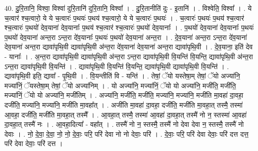 \documentclass[17pt]{extarticle}
\begin{document}
40. दु॒रि॒तानि॒ विश्वा॒ विश्वा॑ दुरि॒तानि॑ दुरि॒तानि॒ विश्वा᳚ । . दु॒रि॒तानीति॑ दुः - इ॒तानि॑ । . विश्वेति॒ विश्वा᳚ । . ये च॒त्वार॑ श्च॒त्वारो॒ ये ये च॒त्वारः॑ प॒थयः॑ प॒थय॑ श्च॒त्वारो॒ ये ये च॒त्वारः॑ प॒थयः॑ । . च॒त्वारः॑ प॒थयः॑ प॒थय॑ श्च॒त्वार॑ श्च॒त्वारः॑ प॒थयो॑ देव॒याना॑ देव॒यानाः᳚ प॒थय॑ श्च॒त्वार॑ श्च॒त्वारः॑ प॒थयो॑ देव॒यानाः᳚ । . प॒थयो॑ देव॒याना॑ देव॒यानाः᳚ प॒थयः॑ प॒थयो॑ देव॒याना॑ अन्त॒रा ऽन्त॒रा दे॑व॒यानाः᳚ प॒थयः॑ प॒थयो॑ देव॒याना॑ अन्त॒रा । . दे॒व॒याना॑ अन्त॒रा ऽन्त॒रा दे॑व॒याना॑ देव॒याना॑ अन्त॒रा द्यावा॑पृथि॒वी द्यावा॑पृथि॒वी अ॑न्त॒रा दे॑व॒याना॑ देव॒याना॑ अन्त॒रा द्यावा॑पृथि॒वी । . दे॒व॒याना॒ इति॑ देव - यानाः᳚ । . अ॒न्त॒रा द्यावा॑पृथि॒वी द्यावा॑पृथि॒वी अ॑न्त॒रा ऽन्त॒रा द्यावा॑पृथि॒वी वि॒यन्ति॑ वि॒यन्ति॒ द्यावा॑पृथि॒वी अ॑न्त॒रा ऽन्त॒रा द्यावा॑पृथि॒वी वि॒यन्ति॑ । . द्यावा॑पृथि॒वी वि॒यन्ति॑ वि॒यन्ति॒ द्यावा॑पृथि॒वी द्यावा॑पृथि॒वी वि॒यन्ति॑ । . द्यावा॑पृथि॒वी इति॒ द्यावा᳚ - पृ॒थि॒वी । . वि॒यन्तीति॑ वि - यन्ति॑ । . तेषां॒ ॅयो यस्तेषा॒म् तेषां॒ ॅयो अज्या॑नि॒ मज्या॑निं॒ ॅयस्तेषा॒म् तेषां॒ ॅयो अज्या॑निम् । . यो अज्या॑नि॒ मज्या॑निं॒ ॅयो यो अज्या॑नि॒ मजी॑ति॒ मजी॑ति॒ मज्या॑निं॒ ॅयो यो अज्या॑नि॒ मजी॑तिम् । . अज्या॑नि॒ मजी॑ति॒ मजी॑ति॒ मज्या॑नि॒ मज्या॑नि॒ मजी॑ति मा॒वहा॑ दा॒वहा॒ दजी॑ति॒ मज्या॑नि॒ मज्या॑नि॒ मजी॑ति मा॒वहा᳚त् । . अजी॑ति मा॒वहा॑ दा॒वहा॒ दजी॑ति॒ मजी॑ति मा॒वहा॒त् तस्मै॒ तस्मा॑ आ॒वहा॒ दजी॑ति॒ मजी॑ति मा॒वहा॒त् तस्मै᳚ । . आ॒वहा॒त् तस्मै॒ तस्मा॑ आ॒वहा॑ दा॒वहा॒त् तस्मै॑ नो न॒ स्तस्मा॑ आ॒वहा॑ दा॒वहा॒त् तस्मै॑ नः । . आ॒वहा॒दित्या᳚ - वहा᳚त् । . तस्मै॑ नो न॒ स्तस्मै॒ तस्मै॑ नो देवा देवा न॒ स्तस्मै॒ तस्मै॑ नो देवाः । . नो॒ दे॒वा॒ दे॒वा॒ नो॒ नो॒ दे॒वाः॒ परि॒ परि॑ देवा नो नो देवाः॒ परि॑ । . दे॒वाः॒ परि॒ परि॑ देवा देवाः॒ परि॑ दत्त दत्त॒ परि॑ देवा देवाः॒ परि॑ दत्त । \newline
\pagebreak
{}
\end{document}
